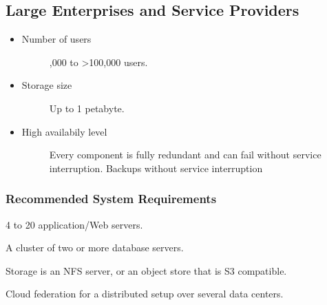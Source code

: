 \documentclass[letterpaper,10pt,english]{sphinxmanual}
\begin{document}
\subsection{Large Enterprises and Service Providers}
\label{installation/deployment_recommendations:large-enterprises-and-service-providers}\begin{itemize}
\item {} \begin{description}
\item[{Number of users}] ,000 to \textgreater{}100,000 users.

\end{description}

\item {} \begin{description}
\item[{Storage size}] \leavevmode
Up to 1 petabyte.

\end{description}

\item {} \begin{description}
\item[{High availabily level}] \leavevmode
Every component is fully redundant and can fail without service interruption.
Backups without service interruption

\end{description}

\end{itemize}


\subsubsection{Recommended System Requirements}
\label{installation/deployment_recommendations:id2}
4 to 20 application/Web servers.

A cluster of two or more database servers.

Storage is an NFS server, or an object store that is S3 compatible.

Cloud federation for a distributed setup over several data centers.
\end{document}
